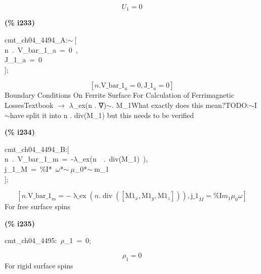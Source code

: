 \documentclass[fleqn]{article}
\begin{document}
\[\tag{\% o232} 
{U_1}=0\mbox{}
\]


\noindent
\begin{minipage}[t]{4.000000em}\color{red}\bfseries
(\% i233)	
\end{minipage}
\begin{minipage}[t]{\textwidth}\color{blue}
cmt\_ch04\_4494\_A:\ensuremath{\sim\ }[\ \\
n\ .\ V\_bar\_1\_a\ =\ 0\ ,\ \\
J\_1\_a\ =\ 0\ \ \ \ \\
];
\end{minipage}
\[\displaystyle \tag{\% o233} 
\left[ n\ensuremath{\mathrm{ . }}{{\ensuremath{\mathrm{V\_ bar\_ 1}}}_a}=0\operatorname{,}{{\ensuremath{\mathrm{J\_ 1}}}_a}=0\right] \mbox{}
\]
Boundary Conditions On Ferrite Surface For Calculation of Ferrimagnetic LossesTextbook \ensuremath{\longrightarrow} \ensuremath{\lambda}\_ex(n . ∇)\ensuremath{\sim }. M\_1What exactly does this mean?TODO:\ensuremath{\sim }I\ensuremath{\sim }have split it into n . div(M\_1) but this needs to be verified


\noindent
\begin{minipage}[t]{4.000000em}\color{red}\bfseries
(\% i234)	
\end{minipage}
\begin{minipage}[t]{\textwidth}\color{blue}
cmt\_ch04\_4494\_B:[\\
n\ .\ V\_bar\_1\_m\ =\ -\ensuremath{\lambda}\_ex(n\ \ .\ div(M\_1)\ ),\\
j\_1\_M\ =\ \%I*\ \ensuremath{\omega}*\ensuremath{\sim\ }\ensuremath{\mu}\_0*\ensuremath{\sim\ }m\_1\\
];
\end{minipage}
\[\displaystyle \tag{\% o234} 
\left[ n\ensuremath{\mathrm{ . }}{{\ensuremath{\mathrm{V\_ bar\_ 1}}}_m}=-\operatorname{\lambda \_ ex}\left( n\ensuremath{\mathrm{ . }}\operatorname{div}\left( \left[ {{\ensuremath{\mathrm{M1}}}_x}\operatorname{,}{{\ensuremath{\mathrm{M1}}}_y}\operatorname{,}{{\ensuremath{\mathrm{M1}}}_z}\right] \right) \right) \operatorname{,}{{\ensuremath{\mathrm{j\_ 1}}}_M}=\ensuremath{\mathrm{\% I}} {m_1} {{\mu }_0} \omega \right] \mbox{}
\]
For free surface spins


\noindent
\begin{minipage}[t]{4.000000em}\color{red}\bfseries
(\% i235)	
\end{minipage}
\begin{minipage}[t]{\textwidth}\color{blue}
cmt\_ch04\_4495:\ \ensuremath{\rho}\_1\ =\ 0;
\end{minipage}
\[\displaystyle \tag{\% o235} 
{{\rho }_1}=0\mbox{}
\]
For rigid surface spins
\end{document}
